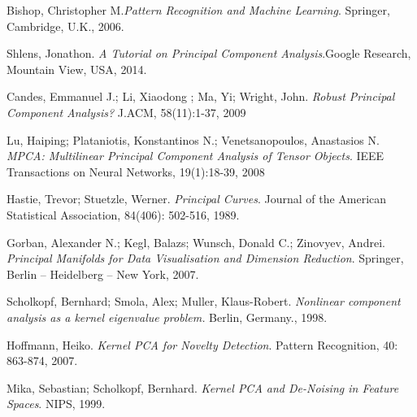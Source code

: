 \begin{thebibliography}{9}

 Bishop, Christopher M.\textit{Pattern Recognition and Machine Learning}. Springer, Cambridge, U.K., 2006.

 Shlens, Jonathon. \textit{A Tutorial on Principal Component Analysis}.Google Research, Mountain View, USA, 2014.

 Candes, Emmanuel J.; Li, Xiaodong ; Ma, Yi; Wright, John. \textit{Robust Principal Component Analysis?} J.ACM, 58(11):1-37, 2009 
 
 Lu, Haiping; Plataniotis, Konstantinos N.; Venetsanopoulos,  
 Anastasios N. 
 \textit{MPCA: Multilinear Principal Component Analysis of Tensor Objects}.  IEEE Transactions on Neural Networks, 19(1):18-39, 2008
 
 Hastie, Trevor; Stuetzle, Werner. \textit{Principal Curves}. Journal of the American Statistical Association, 84(406): 502-516, 1989.

 Gorban,  Alexander N.; Kegl, Balazs; Wunsch, Donald C.; Zinovyev, Andrei. \textit{Principal Manifolds for Data Visualisation and Dimension Reduction}. Springer, Berlin – Heidelberg – New York, 2007. 

Scholkopf, Bernhard; Smola, Alex; Muller, Klaus-Robert.
\textit{Nonlinear component analysis as a kernel eigenvalue problem.}  Berlin, Germany., 1998.

Hoffmann, Heiko.\textit{ Kernel PCA for Novelty Detection}. Pattern Recognition, 40: 863-874, 2007.
 
Mika, Sebastian; Scholkopf, Bernhard. \textit{Kernel PCA and De-Noising in Feature Spaces}. NIPS, 1999.
\end{thebibliography}

